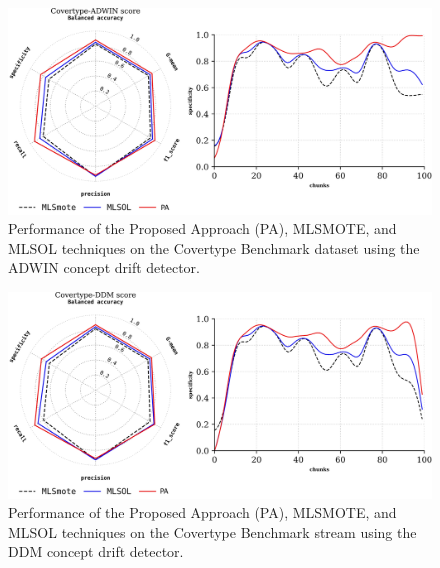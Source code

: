 \begin{figure}[!ht]
	\centering
	\includegraphics[width=1\linewidth]{4_Imbalanced/figures/exp_1.png}
	\caption{Performance of the Proposed Approach (PA), MLSMOTE, and MLSOL techniques on the Covertype Benchmark dataset using the ADWIN concept drift detector.}
	\label{fig:4_first_proposal_result_exp_1}
\end{figure}

\begin{figure}[!ht]
	\centering
	\includegraphics[width=1\linewidth]{4_Imbalanced/figures/exp_2.png}
  \caption{Performance of the Proposed Approach (PA), MLSMOTE, and MLSOL techniques on the Covertype Benchmark stream using the DDM concept drift detector.}
	\label{fig:4_first_proposal_result_exp_2}
\end{figure}

